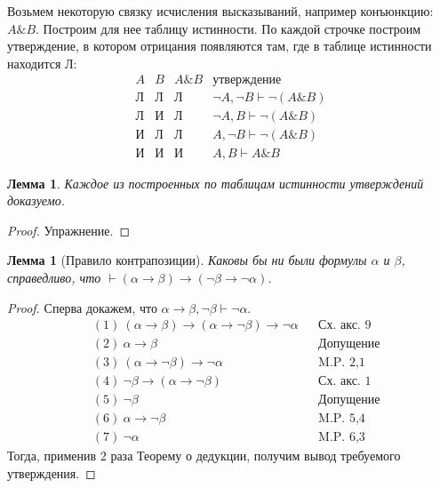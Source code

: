 \documentclass[a4paper,11pt]{article}
\newtheorem{lmm}[thm]{Лемма}
\theoremstyle{definition}
\newcommand{\proves}{\vdash}
\newcommand{\True}{\text{И}}
\newcommand{\False}{\text{Л}}
\begin{document}
Возьмем некоторую связку исчисления высказываний, например конъюнкцию:
$A\mathbin{\&}B$. Построим для нее таблицу истинности. По каждой строчке построим
утверждение, в котором отрицания появляются там, где в таблице истинности
находится $\False$:
\[
\begin{array}{cc|c|l}
A & B & A\mathbin{\&}B & \text{утверждение}\\\hline
\False & \False & \False & \neg A, \neg B \proves \neg(A\mathbin{\&}B)\\
\False & \True & \False & \neg A, B \proves \neg(A\mathbin{\&}B)\\
\True & \False & \False & A, \neg B \proves \neg(A\mathbin{\&}B)\\
\True & \True & \True & A, B \proves A\mathbin{\&}B
\end{array}
\]

\begin{lmm}
Каждое из построенных по таблицам истинности утверждений доказуемо.
\end{lmm}
\begin{proof}
Упражнение.
\end{proof}

\begin{lmm}[Правило контрапозиции]
Каковы бы ни были формулы $\alpha$ и $\beta$, справедливо, что
$\proves (\alpha \to \beta) \to (\neg\beta \to \neg\alpha)$.
\end{lmm}
\begin{proof}
Сперва докажем, что $\alpha \to \beta, \neg\beta \proves \neg\alpha$.
\begin{align*}
&(1)\ (\alpha \to \beta) \to (\alpha \to \neg\beta) \to \neg\alpha &&\text{Сх. акс. 9}\\
&(2)\ \alpha \to \beta &&\text{Допущение}\\
&(3)\ (\alpha \to \neg\beta) \to \neg\alpha &&\text{M.P. 2,1}\\
&(4)\ \neg\beta \to (\alpha \to \neg\beta) &&\text{Сх. акс. 1}\\
&(5)\ \neg\beta &&\text{Допущение}\\
&(6)\ \alpha \to \neg\beta &&\text{M.P. 5,4}\\
&(7)\ \neg\alpha &&\text{M.P. 6,3}
\end{align*}
Тогда, применив 2 раза Теорему о дедукции, получим вывод требуемого
утверждения.
\end{proof}
\end{document}
